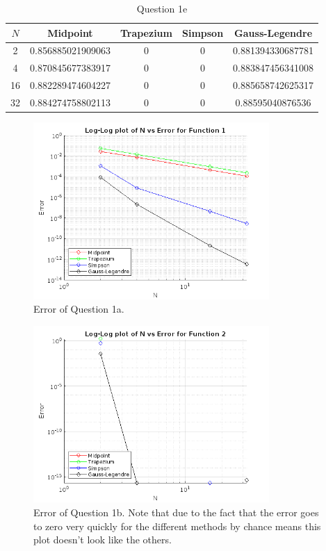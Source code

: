 \documentclass[letterpaper, reqno,11pt]{article}
\begin{document}
\begin{table}
\centering
\begin{tabular}{|c|c|c|c|c|}
\hline
$N$ & Midpoint & Trapezium & Simpson & Gauss-Legendre \\
\hline
2 & 0.856885021909063 & 0 & 0 & 0.881394330687781 \\
\hline
4 & 0.870845677383917 & 0 & 0 & 0.883847456341008 \\
\hline
16 & 0.882289474604227 & 0 & 0 & 0.885658742625317 \\
\hline
32 & 0.884274758802113 & 0 & 0 & 0.88595040876536 \\
\hline
\end{tabular}
\caption{Question 1e}
\label{tab:q1e}
\end{table}

\begin{figure}[htpb]
    \centering
    \includegraphics[width=0.8\textwidth]{q1a}
    \caption{Error of Question 1a.}
    \label{fig:q1a}
\end{figure}
\begin{figure}[htpb]
    \centering
    \includegraphics[width=0.8\textwidth]{q1b}
    \caption{Error of Question 1b. Note that due to the fact that the error goes to zero very quickly for the different methods by chance means this plot doesn't look like the others.}
    \label{fig:q1b}
\end{figure}
\end{document}
